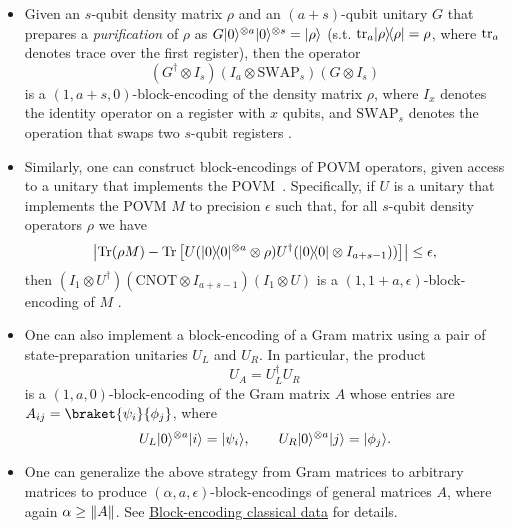 \begin{refsection}
\begin{itemize}
\item Given an $s$-qubit density matrix $\rho$ and an $(a+s)$-qubit unitary $G$ that prepares a \emph{purification} of $\rho$ as $G\lvert0\rangle^{\otimes a}\lvert0\rangle^{\otimes s}=\lvert\rho\rangle$ (s.t. $\text{tr}_a \lvert\rho\rangle\!\langle\rho\rvert=\rho$, where $\text{tr}_a$ denotes trace over the first register), then the operator~\cite{low2016HamSimQubitization}
\begin{equation}
(G^\dagger\otimes I_s)(I_a\otimes \mathrm{SWAP}_s)(G\otimes I_s)
\end{equation}
is a $(1, a+s, 0)$-block-encoding of the density matrix $\rho$, where $I_x$ denotes the identity operator on a register with $x$ qubits, and $\mathrm{SWAP}_s$ denotes the operation that swaps two $s$-qubit registers \cite[Lemma 45]{gilyen2018QSingValTransf}. 

\item Similarly, one can construct block-encodings of POVM operators, given access to a unitary that implements the POVM~\cite{apeldoorn2018ImprovedQSDPSolving}. Specifically, if $U$ is a unitary that implements the POVM $M$ to precision $\epsilon$ such that, for all $s$-qubit density operators $\rho$ we have
\begin{equation}
    \left |\mathrm{Tr}(\rho M) -\mathrm{Tr}\left [U(\lvert0\rangle\!\langle0\rvert^{\otimes a}\otimes\rho)U^\dagger (\lvert0\rangle\!\langle0\rvert\otimes I_{a+s-1}))\right ] \right |\leq \epsilon,
\end{equation}
then $(I_1\otimes U^\dagger)(\mathrm{CNOT}\otimes I_{a+s-1})(I_1\otimes U)$ is a $(1,1+a,\epsilon)$-block-encoding of $M$ \cite[Lemma 46]{gilyen2018QSingValTransf}.

\item One can also implement a block-encoding of a Gram matrix using a pair of state-preparation unitaries $U_L$ and $U_R$. In particular, the product
\begin{equation}
U_A=U_L^\dagger U_R
\end{equation}
is a $(1,a,0)$-block-encoding of the Gram matrix $A$ whose entries are $A_{ij}=\braket{\psi_i}{\phi_j}$, where~\cite[Lemma 47]{gilyen2018QSingValTransf}
\begin{equation}
U_L\lvert0\rangle^{\otimes a}\lvert i\rangle=\lvert\psi_i\rangle,\qquad U_R\lvert0\rangle^{\otimes a}\lvert j\rangle=\lvert\phi_j\rangle.
\end{equation} 

\item One can generalize the above strategy from Gram matrices to arbitrary matrices to produce $(\alpha, a, \epsilon)$-block-encodings of general matrices $A$, where again $\alpha\geq\lVert A\rVert$. See \hyperref[prim:BlockEncodingsClassical]{Block-encoding classical data} for details.


\end{itemize}
\end{refsection}
